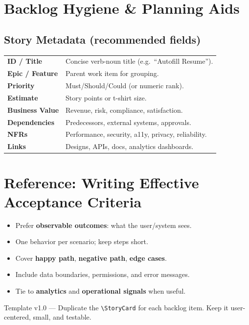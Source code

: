 \documentclass[11pt,a4paper]{article}
\newcommand{\eg}{e.g.\ }
\newlength{\StoryLabelW}
\newlength{\StoryValueW}
\begin{document}
\section{Backlog Hygiene \& Planning Aids}
\subsection*{Story Metadata (recommended fields)}
\begin{tabular}{@{}>{\raggedleft\arraybackslash\bfseries}p{\StoryLabelW} >{\RaggedRight\arraybackslash}p{\StoryValueW}@{}}
\textbf{ID / Title} & Concise verb-noun title (\eg ``Autofill Resume'').\\
\textbf{Epic / Feature} & Parent work item for grouping.\\
\textbf{Priority} & Must/Should/Could (or numeric rank).\\
\textbf{Estimate} & Story points or t-shirt size.\\
\textbf{Business Value} & Revenue, risk, compliance, satisfaction.\\
\textbf{Dependencies} & Predecessors, external systems, approvals.\\
\textbf{NFRs} & Performance, security, a11y, privacy, reliability.\\
\textbf{Links} & Designs, APIs, docs, analytics dashboards.\\
\end{tabular}

\section{Reference: Writing Effective Acceptance Criteria}
\begin{itemize}
  \item Prefer \textbf{observable outcomes}: what the user/system sees.
  \item One behavior per scenario; keep steps short.
  \item Cover \textbf{happy path}, \textbf{negative path}, \textbf{edge cases}.
  \item Include data boundaries, permissions, and error messages.
  \item Tie to \textbf{analytics} and \textbf{operational signals} when useful.
\end{itemize}

\vfill
\begin{center}
\textcolor{Meta}{\footnotesize Template v1.0 --- Duplicate the \texttt{\textbackslash StoryCard} for each backlog item. Keep it user-centered, small, and testable.}
\end{center}
\end{document}
